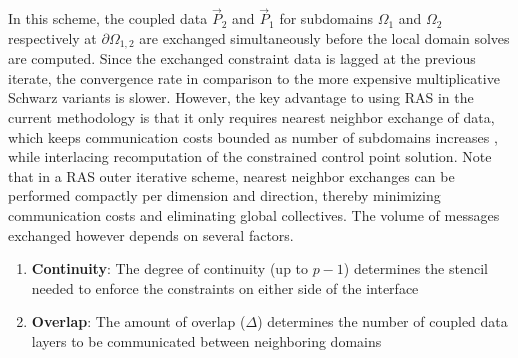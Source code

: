 \documentclass[conference]{IEEEtran}
\newcommand{\eqt}[1]{Equation~(\ref{#1})}
\begin{document}
In this scheme, the coupled data $\vec{P}_2$ and $\vec{P}_1$ for subdomains $\Omega_1$ and $\Omega_2$ respectively at $\partial \Omega_{1,2}$ are exchanged simultaneously before the local domain solves are computed. Since the exchanged constraint data is lagged at the previous iterate, the convergence rate in comparison to the more expensive multiplicative Schwarz variants \cite{smith-ddm} is slower. However, the key advantage to using RAS in the current methodology is that it only requires nearest neighbor exchange of data, which keeps communication costs bounded as number of subdomains increases \cite{orasm-as-ms-2007, gander-rasm}, while interlacing recomputation of the constrained control point solution. Note that in a RAS outer iterative scheme, nearest neighbor exchanges can be performed compactly per dimension and direction, thereby minimizing communication costs and eliminating global collectives.
%
%
The volume of messages exchanged however depends on several factors.

\begin{enumerate}
	\item \textbf{Continuity}: The degree of continuity (up to $p-1$) determines the stencil needed to enforce the constraints on either side of the interface 
	\item \textbf{Overlap}: The amount of overlap ($\Delta$) determines the number of coupled data layers to be communicated between neighboring domains
\end{enumerate}
\end{document}
